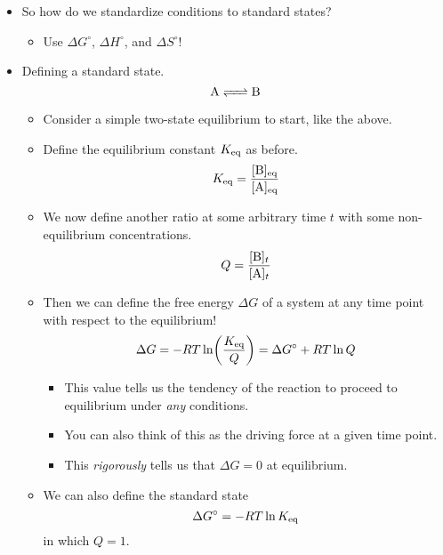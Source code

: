 \documentclass[../notes.tex]{subfiles}
\begin{document}
\begin{itemize}
    \item So how do we standardize conditions to standard states?
    \begin{itemize}
        \item Use $\Delta G^\circ$, $\Delta H^\circ$, and $\Delta S^\circ$!
    \end{itemize}
    \item Defining a standard state.
    \begin{equation*}
        \ce{A <=> B}
    \end{equation*}
    \begin{itemize}
        \item Consider a simple two-state equilibrium to start, like the above.
        \item Define the equilibrium constant $K_\textup{eq}$ as before.
        \begin{equation*}
            \Keq = \frac{\cnc[eq]{B}}{\cnc[eq]{A}}
        \end{equation*}
        \item We now define another ratio at some arbitrary time $t$ with some non-equilibrium concentrations.
        \begin{equation*}
            Q = \frac{\cnc[$t$]{B}}{\cnc[$t$]{A}}
        \end{equation*}
        \item Then we can define the free energy $\Delta G$ of a system at any time point with respect to the equilibrium!
        \begin{equation*}
            \Delta G = -RT\ln(\frac{K_\textup{eq}}{Q})
            = \Delta G^\circ+RT\ln Q
        \end{equation*}
        \begin{itemize}
            \item This value tells us the tendency of the reaction to proceed to equilibrium under \emph{any} conditions.
            \item You can also think of this as the driving force at a given time point.
            \item This \emph{rigorously} tells us that $\Delta G=0$ at equilibrium.
        \end{itemize}
        \item We can also define the standard state
        \begin{equation*}
            \Delta G^\circ = -RT\ln K_\textup{eq}
        \end{equation*}
        in which $Q=1$.
        \begin{itemize}

\end{itemize}
\end{itemize}
\end{itemize}
\end{document}

